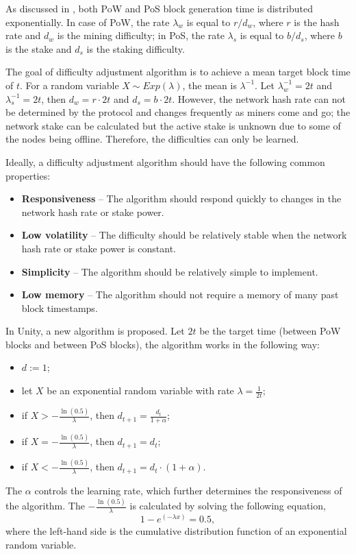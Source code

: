 \documentclass[a4paper]{article}
\begin{document}
As discussed in \cite{bitfury2015}, both PoW and PoS block generation time is distributed exponentially. In case of PoW, the rate $\lambda_w$ is equal to $r/d_w$, where $r$ is the hash rate and $d_w$ is the mining difficulty; in PoS, the rate $\lambda_s$ is equal to $b/d_s$, where $b$ is the stake and $d_s$ is the staking difficulty.

The goal of difficulty adjustment algorithm is to achieve a mean target block time of $t$. For a random variable $X \sim Exp(\lambda)$, the mean is $\lambda^{-1}$. Let $\lambda_w^{-1} = 2t$ and $\lambda_s^{-1} = 2t$, then $d_w = r \cdot 2t$ and $d_s = b \cdot 2t$. However, the network hash rate can not be determined by the protocol and changes frequently as miners come and go; the network stake can be calculated but the active stake is unknown due to some of the nodes being offline. Therefore, the difficulties can only be learned.

Ideally, a difficulty adjustment algorithm should have the following common properties:
\begin{itemize}
    \item \textbf{Responsiveness} -- The algorithm should respond quickly to changes in the network hash rate or stake power.
    \item \textbf{Low volatility} -- The difficulty should be relatively stable when the network hash rate or stake power is constant. 
    \item \textbf{Simplicity} -- The algorithm should be relatively simple to implement.
    \item \textbf{Low memory} -- The algorithm should not require a memory of many past block timestamps.
\end{itemize}

In Unity, a new algorithm is proposed. Let $2t$ be the target time (between PoW blocks and between PoS blocks), the algorithm works in the following way:
\begin{itemize}
    \item $d := 1$;
    \item let $X$ be an exponential random variable with rate $\lambda = \frac{1}{2t}$;
    \item if $X > -\frac{\ln (0.5)}{\lambda}$, then $d_{t+1} = \frac{d_t}{1 + \alpha}$;
    \item if $X = -\frac{\ln (0.5)}{\lambda}$, then $d_{t+1} = d_t$;
    \item if $X < -\frac{\ln (0.5)}{\lambda}$, then $d_{t+1} = d_t \cdot (1 + \alpha)$.
\end{itemize}
The $\alpha$ controls the learning rate, which further determines the responsiveness of the algorithm. The $-\frac{\ln (0.5)}{\lambda}$ is calculated by solving the following equation,
\begin{equation}
    1-e^{(-\lambda x)}=0.5,
\end{equation}
where the left-hand side is the cumulative distribution function of an exponential random variable.
\end{document}
